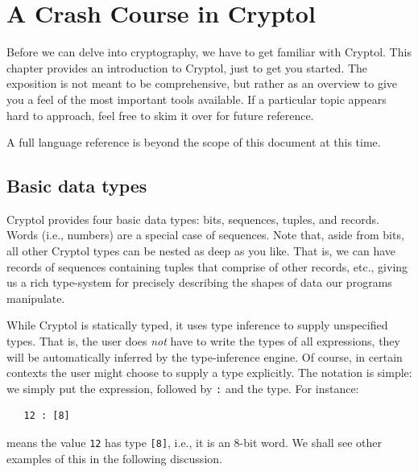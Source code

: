 
\chapter{A Crash Course in Cryptol}
\label{cha:crash-course-cryptol}

Before we can delve into cryptography, we have to get familiar with
Cryptol.  This chapter provides an introduction to Cryptol, just to
get you started. The exposition is not meant to be comprehensive, but
rather as an overview to give you a feel of the most important tools
available.  If a particular topic appears hard to approach, feel free
to skim it over for future reference.  

A full language reference is beyond the scope of this document at this
time.


\section{Basic data types}
\label{sec:basic-data-types}

Cryptol provides four basic data types: bits, sequences, tuples, and
records.  Words (i.e., numbers) are a special case of sequences.  Note
that, aside from bits, all other Cryptol types can be nested as deep
as you like. That is, we can have records of sequences containing
tuples that comprise of other records, etc., giving us a rich
type-system for precisely describing the shapes of data our programs
manipulate.

While Cryptol is statically typed, it uses type inference to supply
unspecified types.  That is, the user does {\em not} have to write the
types of all expressions, they will be automatically inferred by the
type-inference engine.  Of course, in certain contexts the user might
choose to supply a type explicitly.  The notation is simple: we simply
put the expression, followed by {\tt :} and the type. For instance:
\begin{Verbatim}
   12 : [8]
\end{Verbatim}
means the value {\tt 12} has type {\tt [8]}, i.e., it is an 8-bit
word. We shall see other examples of this in the following discussion.

